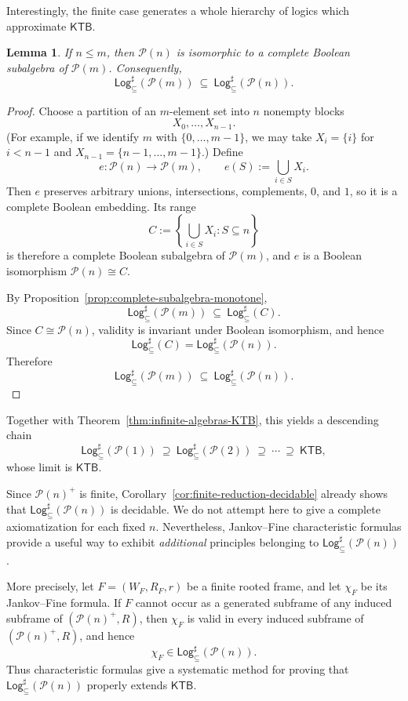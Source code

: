 \documentclass[11pt]{amsart}
\theoremstyle{definition}
\theoremstyle{plain}
\newtheorem{lemma}[definition]{Lemma}
\newcommand{\Pow}{\mathcal P}
\newcommand{\KTB}{\mathsf{KTB}}
\newcommand{\Logsub}{\mathsf{Log}_{\subseteq}^{\sharp}}
\begin{document}
Interestingly, the finite case generates a whole hierarchy of logics which approximate $\KTB$. 

\begin{lemma}\label{lem:pow-monotonicity}
If $n\le m$, then $\Pow(n)$ is isomorphic to a complete Boolean subalgebra of $\Pow(m)$.
Consequently,
\[
\Logsub(\Pow(m))\ \subseteq\ \Logsub(\Pow(n)).
\]
\end{lemma}

\begin{proof}
Choose a partition of an $m$-element set into $n$ nonempty blocks
\[
X_0,\dots,X_{n-1}.
\]
(For example, if we identify $m$ with $\{0,\dots,m-1\}$, we may take
$X_i=\{i\}$ for $i<n-1$ and $X_{n-1}=\{n-1,\dots,m-1\}$.)
Define
\[
e:\Pow(n)\to \Pow(m),\qquad e(S):=\bigcup_{i\in S} X_i.
\]
Then $e$ preserves arbitrary unions, intersections, complements, $0$, and $1$, so it is a complete
Boolean embedding. Its range
\[
C:=\left\{\bigcup_{i\in S}X_i : S\subseteq n\right\}
\]
is therefore a complete Boolean subalgebra of $\Pow(m)$, and $e$ is a Boolean isomorphism
$\Pow(n)\cong C$.

By Proposition~\ref{prop:complete-subalgebra-monotone},
\[
\Logsub(\Pow(m))\ \subseteq\ \Logsub(C).
\]
Since $C\cong \Pow(n)$, validity is invariant under Boolean isomorphism, and hence
\[
\Logsub(C)=\Logsub(\Pow(n)).
\]
Therefore
\[
\Logsub(\Pow(m))\ \subseteq\ \Logsub(\Pow(n)).
\]
\end{proof}







Together with Theorem~\ref{thm:infinite-algebras-KTB}, this yields a descending chain
\[
\Logsub(\Pow(1))\ \supseteq\ \Logsub(\Pow(2))\ \supseteq\ \cdots\ \supseteq\ \KTB,
\]
whose limit is $\KTB$.

\medskip


Since $\Pow(n)^+$ is finite, Corollary~\ref{cor:finite-reduction-decidable} already shows that
$\Logsub(\Pow(n))$ is decidable. We do not attempt here to give a complete
axiomatization for each fixed $n$. Nevertheless, Jankov--Fine characteristic formulas provide a
useful way to exhibit \emph{additional} principles belonging to $\Logsub(\Pow(n))$.

More precisely, let $F=(W_F,R_F,r)$ be a finite rooted frame, and let $\chi_F$ be its
Jankov--Fine formula. If $F$ cannot occur as a generated subframe of any induced subframe of
$(\Pow(n)^+,R)$, then $\chi_F$ is valid in every induced subframe of $(\Pow(n)^+,R)$, and hence
\[
\chi_F\in \Logsub(\Pow(n)).
\]
Thus characteristic formulas give a systematic method for proving that
$\Logsub(\Pow(n))$ properly extends $\mathsf{KTB}$. 
\end{document}
